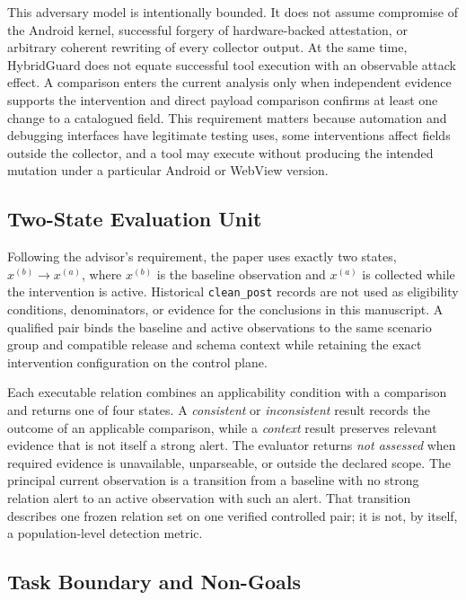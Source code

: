 This adversary model is intentionally bounded. It does not assume compromise of the Android kernel, successful forgery of hardware-backed attestation, or arbitrary coherent rewriting of every collector output. At the same time, HybridGuard does not equate successful tool execution with an observable attack effect. A comparison enters the current analysis only when independent evidence supports the intervention and direct payload comparison confirms at least one change to a catalogued field. This requirement matters because automation and debugging interfaces have legitimate testing uses, some interventions affect fields outside the collector, and a tool may execute without producing the intended mutation under a particular Android or WebView version.

\subsection{Two-State Evaluation Unit}

Following the advisor's requirement, the paper uses exactly two states, $x^{(b)}\rightarrow x^{(a)}$, where $x^{(b)}$ is the baseline observation and $x^{(a)}$ is collected while the intervention is active. Historical \texttt{clean\_post} records are not used as eligibility conditions, denominators, or evidence for the conclusions in this manuscript. A qualified pair binds the baseline and active observations to the same scenario group and compatible release and schema context while retaining the exact intervention configuration on the control plane.

Each executable relation combines an applicability condition with a comparison and returns one of four states. A \emph{consistent} or \emph{inconsistent} result records the outcome of an applicable comparison, while a \emph{context} result preserves relevant evidence that is not itself a strong alert. The evaluator returns \emph{not assessed} when required evidence is unavailable, unparseable, or outside the declared scope. The principal current observation is a transition from a baseline with no strong relation alert to an active observation with such an alert. That transition describes one frozen relation set on one verified controlled pair; it is not, by itself, a population-level detection metric.

\subsection{Task Boundary and Non-Goals}

